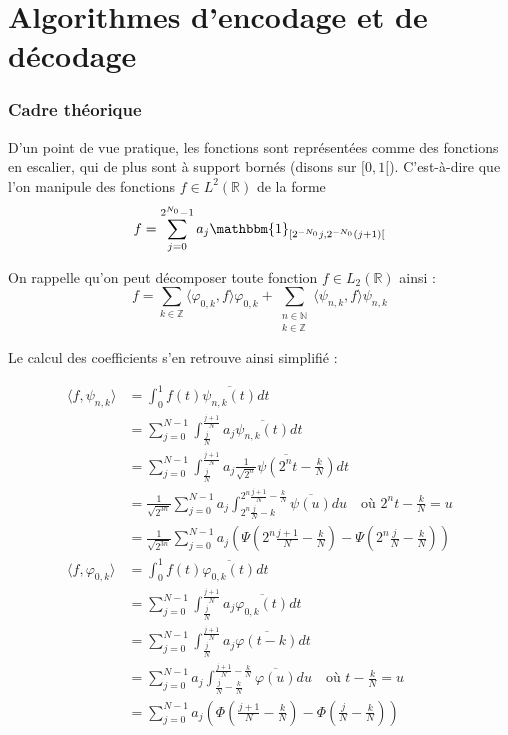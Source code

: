 
\newpage

\part{Algorithmes d'encodage et de décodage}

\section{Cadre théorique}

D'un point de vue pratique, les fonctions sont représentées comme des fonctions en escalier, qui de plus sont à support bornés (disons sur $[0, 1[$). C'est-à-dire que l'on manipule des fonctions $f \in L^2(\mathbb{R})$ de la forme $$f = \sum_{j = 0}^{2^{N_0} - 1} a_j \mathbbm{1}_{[2^{-N_0}j, 2^{-N_0}(j+1)[}$$


On rappelle qu'on peut décomposer toute fonction $f \in L_2(\mathbb{R})$ ainsi : $$f = \sum_{k \in \mathbb{Z}} \langle \varphi_{0,k}, f \rangle \varphi_{0,k} + \sum_{\substack{n \in \mathbb{N} \\ k \in \mathbb{Z}}} \langle \psi_{n, k}, f \rangle \psi_{n, k}$$

Le calcul des coefficients s'en retrouve ainsi simplifié :

\begin{align*}
	\langle f, \psi_{n, k} \rangle &= \int_0^1 f(t) \overline{\psi_{n, k}(t)} dt \\
	&= \sum_{j=0}^{N-1} \int_{\frac j N}^{\frac{j+1}N} a_j \overline{\psi_{n, k}(t)} dt \\
	&= \sum_{j=0}^{N-1} \int_{\frac j N}^{\frac{j+1}N} a_j \overline{\frac{1}{\sqrt{2^n}} \psi(2^n t - \frac{k}{N})} dt \\
	&= \frac{1}{\sqrt{2^{3n}}} \sum_{j=0}^{N-1} a_j \int_{2^n \frac{j}N - k}^{2^n\frac{j+1}N - \frac{k}{N}} \overline{\psi(u)} du \quad \text{où $2^nt - \frac{k}{N} = u$} \\
	&= \frac{1}{\sqrt{2^{3n}}} \sum_{j=0}^{N-1} a_j \left(\Psi\left(2^n\frac{j+1}N - \frac{k}{N}\right) - \Psi\left(2^n\frac{j}N - \frac{k}{N}\right)\right) \\
	\langle f, \varphi_{0, k} \rangle &= \int_0^1 f(t) \overline{\varphi_{0, k}(t)} dt \\
	&= \sum_{j=0}^{N-1} \int_{\frac j N}^{\frac{j+1}N} a_j \overline{\varphi_{0, k}(t)} dt \\
	&= \sum_{j=0}^{N-1} \int_{\frac j N}^{\frac{j+1}N} a_j \overline{\varphi(t - k)} dt \\
	&= \sum_{j=0}^{N-1} a_j \int_{\frac{j}N - \frac{k}{N}}^{\frac{j+1}N - \frac{k}{N}} \overline{\varphi(u)} du \quad \text{où $t - \frac{k}{N} = u$} \\
	&= \sum_{j=0}^{N-1} a_j \left(\Phi\left(\frac{j+1}N - \frac{k}{N}\right) - \Phi\left(\frac{j}N - \frac{k}{N}\right)\right)
\end{align*}

